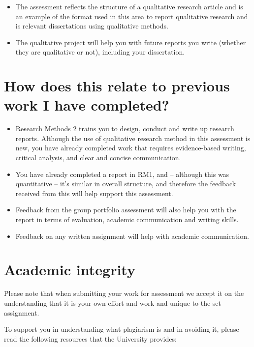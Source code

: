 \documentclass[
  english,
  letterpaper,
  DIV=11,
  numbers=noendperiod]{scrreprt}
\begin{document}
\begin{itemize}
\item
  The assessment reflects the structure of a qualitative research
  article and is an example of the format used in this area to report
  qualitative research and is relevant dissertations using qualitative
  methods.
\item
  The qualitative project will help you with future reports you write
  (whether they are qualitative or not), including your dissertation.
\end{itemize}

\section{How does this relate to previous work I have
completed?}\label{how-does-this-relate-to-previous-work-i-have-completed-3}

\begin{itemize}
\item
  Research Methods 2 trains you to design, conduct and write up research
  reports. Although the use of qualitative research method in this
  assessment is new, you have already completed work that requires
  evidence-based writing, critical analysis, and clear and concise
  communication.
\item
  You have already completed a report in RM1, and -- although this was
  quantitative -- it's similar in overall structure, and therefore the
  feedback received from this will help support this assessment.
\item
  Feedback from the group portfolio assessment will also help you with
  the report in terms of evaluation, academic communication and writing
  skills.
\item
  Feedback on any written assignment will help with academic
  communication.
\end{itemize}

\section{Academic integrity}\label{academic-integrity-2}

Please note that when submitting your work for assessment we accept it
on the understanding that it is your own effort and work and unique to
the set assignment.

To support you in understanding what plagiarism is and in avoiding it,
please read the following resources that the University provides:
\end{document}
